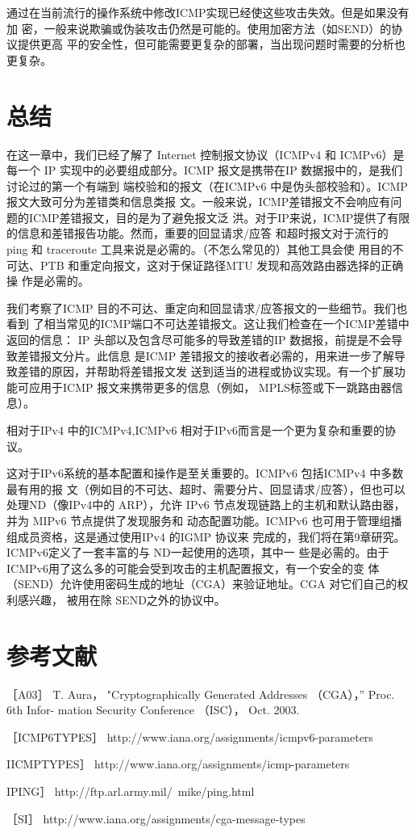 通过在当前流行的操作系统中修改ICMP实现已经使这些攻击失效。但是如果没有加
密，一般来说欺骗或伪装攻击仍然是可能的。使用加密方法（如SEND）的协议提供更高
平的安全性，但可能需要更复杂的部署，当出现问题时需要的分析也更复杂。

\section{总结}

在这一章中，我们已经了解了 Internet 控制报文协议（ICMPv4 和 ICMPv6）是每一个 IP
实现中的必要组成部分。ICMP 报文是携带在IP 数据报中的，是我们讨论过的第一个有端到
端校验和的报文（在ICMPv6 中是伪头部校验和）。ICMP报文大致可分为差错类和信息类报
文。一般来说，ICMP差错报文不会响应有问题的ICMP差错报文，目的是为了避免报文泛
洪。对于IP来说，ICMP提供了有限的信息和差错报告功能。然而，重要的回显请求/应答
和超时报文对于流行的 ping 和 traceroute 工具来说是必需的。（不怎么常见的）其他工具会使
用目的不可达、PTB 和重定向报文，这对于保证路径MTU 发现和高效路由器选择的正确操
作是必需的。

我们考察了ICMP 目的不可达、重定向和回显请求/应答报文的一些细节。我们也看到
了相当常见的ICMP端口不可达差错报文。这让我们检查在一个ICMP差错中返回的信息：
IP 头部以及包含尽可能多的导致差错的IP 数据报，前提是不会导致差错报文分片。此信息
是ICMP 差错报文的接收者必需的，用来进一步了解导致差错的原因，并帮助将差错报文发
送到适当的进程或协议实现。有一个扩展功能可应用于ICMP 报文来携带更多的信息（例如，
MPLS标签或下一跳路由器信息）。

相对于IPv4 中的ICMPv4,ICMPv6 相对于IPv6而言是一个更为复杂和重要的协议。

这对于IPv6系统的基本配置和操作是至关重要的。ICMPv6 包括ICMPv4 中多数最有用的报
文（例如目的不可达、超时、需要分片、回显请求/应答），但也可以处理ND（像IPv4中的
ARP），允许 IPv6 节点发现链路上的主机和默认路由器，并为 MIPv6 节点提供了发现服务和
动态配置功能。ICMPv6 也可用于管理组播组成员资格，这是通过使用IPv4 的IGMP 协议来
完成的，我们将在第9章研究。ICMPv6定义了一套丰富的与 ND一起使用的选项，其中一
些是必需的。由于ICMPv6用了这么多的可能会受到攻击的主机配置报文，有一个安全的变
体（SEND）允许使用密码生成的地址（CGA）来验证地址。CGA 对它们自己的权利感兴趣，
被用在除 SEND之外的协议中。

\section{参考文献}
［A03］ T. Aura， "Cryptographically Generated Addresses （CGA），” Proc. 6th Infor-
mation Security Conference （ISC）， Oct. 2003.

［ICMP6TYPES］ http://www.iana.org/assignments/icmpv6-parameters

IICMPTYPES］ http://www.iana.org/assignments/icmp-parameters

IPING］ http://ftp.arl.army.mil/~mike/ping.html

［SI］ http://www.iana.org/assignments/cga-message-types
